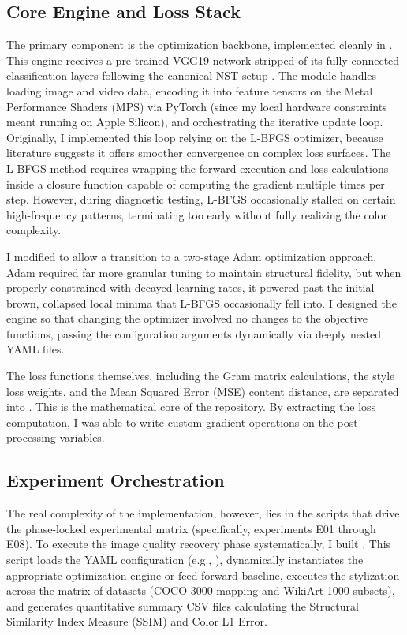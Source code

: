 \documentclass[12pt,letterpaper]{article}
\begin{document}
\subsection{Core Engine and Loss Stack}

The primary component is the optimization backbone, implemented cleanly in . This engine receives a pre-trained VGG19 network stripped of its fully connected classification layers following the canonical NST setup \cite{gatys2016}. The module handles loading image and video data, encoding it into feature tensors on the Metal Performance Shaders (MPS) via PyTorch (since my local hardware constraints meant running on Apple Silicon), and orchestrating the iterative update loop. Originally, I implemented this loop relying on the L-BFGS optimizer, because literature suggests it offers smoother convergence on complex loss surfaces. The L-BFGS method requires wrapping the forward execution and loss calculations inside a closure function capable of computing the gradient multiple times per step. However, during diagnostic testing, L-BFGS occasionally stalled on certain high-frequency patterns, terminating too early without fully realizing the color complexity.

I modified  to allow a transition to a two-stage Adam optimization approach. Adam required far more granular tuning to maintain structural fidelity, but when properly constrained with decayed learning rates, it powered past the initial brown, collapsed local minima that L-BFGS occasionally fell into. I designed the engine so that changing the optimizer involved no changes to the objective functions, passing the configuration arguments dynamically via deeply nested YAML files.

The loss functions themselves, including the Gram matrix calculations, the style loss weights, and the Mean Squared Error (MSE) content distance, are separated into . This is the mathematical core of the repository. By extracting the loss computation, I was able to write custom gradient operations on the post-processing variables.

\subsection{Experiment Orchestration}

The real complexity of the implementation, however, lies in the scripts that drive the phase-locked experimental matrix (specifically, experiments E01 through E08). To execute the image quality recovery phase systematically, I built . This script loads the YAML configuration (e.g., ), dynamically instantiates the appropriate optimization engine or feed-forward baseline, executes the stylization across the matrix of datasets (COCO 3000 mapping and WikiArt 1000 subsets), and generates quantitative summary CSV files calculating the Structural Similarity Index Measure (SSIM) and Color L1 Error.
\end{document}
